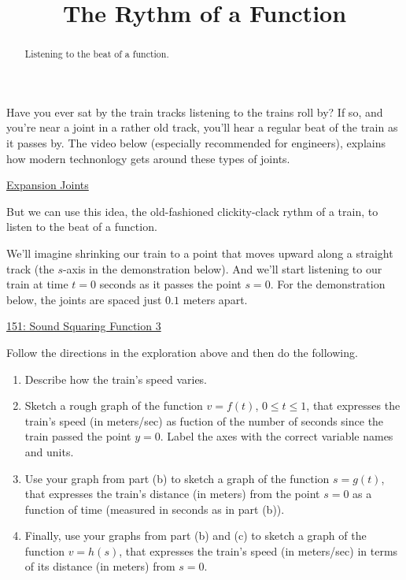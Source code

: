 \documentclass{ximera}
\title{The Rythm of a Function}
\begin{document}
\begin{abstract}
Listening to the beat of a function.
\end{abstract}
\maketitle

Have you ever sat by the train tracks listening to the trains roll by? If so, and you're near a joint in a rather old track, you'll hear a regular beat of the train as it passes by. The video below (especially recommended for engineers), explains how modern technonlogy gets around these types of joints.

\href{https://practical.engineering/blog/2023/12/5/why-railroads-dont-need-expansion-joints}{Expansion Joints}



\begin{exploration}  \label{EP9ppdfgdggt}

But we can use this idea, the old-fashioned clickity-clack rythm of a train, to listen to the beat of a function.

We'll imagine shrinking our train to a point that moves upward along a straight track (the $s$-axis in the demonstration below). And we'll start listening to our train at time $t=0$ seconds as it passes the point $s=0$. For the demonstration below, the joints are spaced just $0.1$ meters apart.

\begin{onlineOnly}
    \begin{center}
\end{center}
\end{onlineOnly}

\href{https://www.desmos.com/calculator/yghwlfxyjo}{151: Sound Squaring Function 3}

Follow the directions in the exploration above and then do the following.

\begin{enumerate}
\item Describe how the train's speed varies.

\item Sketch a rough graph of the function $v=f(t)$, $0\leq t \leq 1$, that expresses the train's speed (in meters/sec) as fuction of the number of seconds since the train passed the point $y=0$. Label the axes with the correct variable names and units.

\item Use your graph from part (b) to sketch a graph of the function $s=g(t)$, that expresses the train's distance (in meters) from the point $s=0$ as a function of time (measured in seconds as in part (b)).

\item Finally, use your graphs from part (b) and (c) to sketch a graph of the function $v=h(s)$, that expresses the train's speed (in meters/sec) in terms of its distance (in meters) from $s=0$.  
\end{enumerate}


\end{exploration}
\end{document}
